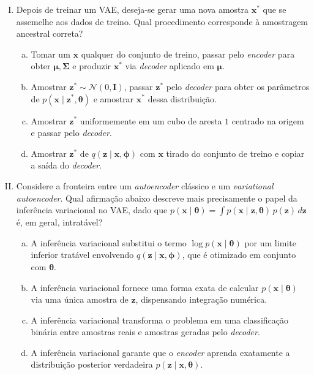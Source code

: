 \documentclass{dlproblemset}
\newcommand{\thetav}{\boldsymbol{\theta}}
\begin{document}
\begin{enumerate}[I)]
    \item Depois de treinar um VAE, deseja-se gerar uma nova amostra $\mathbf{x}^{*}$ que se assemelhe aos dados de treino. Qual procedimento corresponde à amostragem ancestral correta?
    \begin{enumerate}[(a)]
        \item Tomar um $\mathbf{x}$ qualquer do conjunto de treino, passar pelo \textit{encoder} para obter $\boldsymbol{\mu}, \boldsymbol{\Sigma}$ e produzir $\mathbf{x}^{*}$ via \textit{decoder} aplicado em $\boldsymbol{\mu}$.
        \item Amostrar $\mathbf{z}^{*} \sim \mathcal{N}(0, \mathbf{I})$, passar $\mathbf{z}^{*}$ pelo \textit{decoder} para obter os parâmetros de $p(\mathbf{x} \mid \mathbf{z}^{*}, \thetav)$ e amostrar $\mathbf{x}^{*}$ dessa distribuição.
        \item Amostrar $\mathbf{z}^{*}$ uniformemente em um cubo de aresta $1$ centrado na origem e passar pelo \textit{decoder}.
        \item Amostrar $\mathbf{z}^{*}$ de $q(\mathbf{z} \mid \mathbf{x}, \boldsymbol{\phi})$ com $\mathbf{x}$ tirado do conjunto de treino e copiar a saída do \textit{decoder}.
    \end{enumerate}

    \item {} Considere a fronteira entre um \textit{autoencoder} clássico e um \textit{variational autoencoder}. Qual afirmação abaixo descreve mais precisamente o papel da inferência variacional no VAE, dado que $p(\mathbf{x} \mid \thetav) = \int p(\mathbf{x} \mid \mathbf{z}, \thetav)\,p(\mathbf{z})\,d\mathbf{z}$ é, em geral, intratável?
    \begin{enumerate}[(a)]
        \item A inferência variacional substitui o termo $\log p(\mathbf{x} \mid \thetav)$ por um limite inferior tratável envolvendo $q(\mathbf{z} \mid \mathbf{x}, \boldsymbol{\phi})$, que é otimizado em conjunto com $\thetav$.
        \item A inferência variacional fornece uma forma exata de calcular $p(\mathbf{x} \mid \thetav)$ via uma única amostra de $\mathbf{z}$, dispensando integração numérica.
        \item A inferência variacional transforma o problema em uma classificação binária entre amostras reais e amostras geradas pelo \textit{decoder}.
        \item A inferência variacional garante que o \textit{encoder} aprenda exatamente a distribuição posterior verdadeira $p(\mathbf{z} \mid \mathbf{x}, \thetav)$.
    \end{enumerate}


\end{enumerate}
\end{document}
